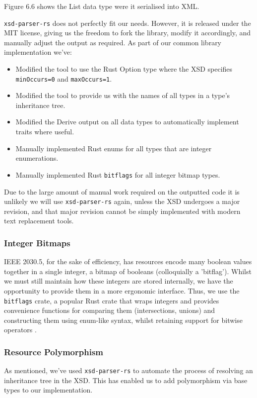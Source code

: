 Figure 6.6 shows the List data type were it serialised into XML.

\texttt{xsd-parser-rs} does not perfectly fit our needs. However, it is released under the MIT license, giving us the freedom to fork the library, modify it accordingly, and manually adjust the output as required. As part of our common library implementation we've:

\begin{itemize}
    \item Modified the tool to use the Rust Option type where the XSD specifies \texttt{minOccurs=0} and \texttt{maxOccurs=1}.
    \item Modified the tool to provide us with the names of all types in a type's inheritance tree.
    \item Modified the Derive output on all data types to automatically implement traits where useful.  
    \item Manually implemented Rust enums for all types that are integer enumerations.
    \item Manually implemented Rust \texttt{bitflags} for all integer bitmap types.
\end{itemize}

Due to the large amount of manual work required on the outputted code it is unlikely we will use \texttt{xsd-parser-rs} again, unless the XSD undergoes a major revision, and that major revision cannot be simply implemented with modern text replacement tools.

\subsubsection{Integer Bitmaps}
IEEE 2030.5, for the sake of efficiency, has resources encode many boolean values together in a single integer, a bitmap of booleans (colloquially a 'bitflag'). Whilst we must still maintain how these integers are stored internally, we have the opportunity to provide them in a more ergonomic interface. Thus, we use the \texttt{bitflags} crate, a popular Rust crate that wraps integers and provides convenience functions for comparing them (intersections, unions) and constructing them using enum-like syntax, whilst retaining support for bitwise operators \cite{bitflags}. 

\subsubsection{Resource Polymorphism}
As mentioned, we've used \texttt{xsd-parser-rs} to automate the process of resolving an inheritance tree in the XSD. This has enabled us to add polymorphism via base types to our implementation.

